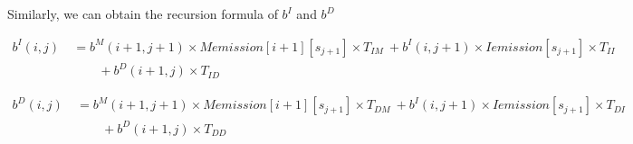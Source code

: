 \documentclass[10pt]{article}
\begin{document}
    Similarly, we can obtain the recursion formula of $b^{I}$ and $b^{D}$

    \begin{equation}
    \begin{aligned}
      b^I(i, j) \
        &= b^M(i+1, j+1) \times Memission[i+1][s_{j+1}] \times T_{IM} \
          + b^I(i, j+1) \times Iemission[s_{j+1}] \times T_{II} \\
          &\qquad+ b^D(i+1, j) \times T_{ID}
    \end{aligned}
    \end{equation}

    \begin{equation}
    \begin{aligned}
      b^D(i, j) \
        &= b^M(i+1, j+1) \times Memission[i+1][s_{j+1}] \times T_{DM} \
          + b^I(i, j+1) \times Iemission[s_{j+1}] \times T_{DI} \\
          &\qquad+ b^D(i+1, j) \times T_{DD}
    \end{aligned}
    \end{equation}
\end{document}
